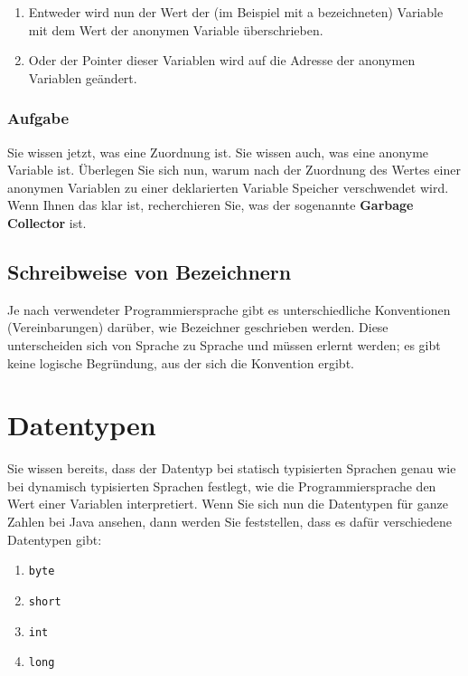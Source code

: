 \begin{enumerate}
	\item Entweder wird nun der Wert der (im Beispiel mit a bezeichneten) Variable mit dem Wert der anonymen Variable überschrieben.
	\item Oder der Pointer dieser Variablen wird auf die Adresse der anonymen Variablen geändert.
\end{enumerate}

\subsubsection{Aufgabe}

Sie wissen jetzt, was eine Zuordnung ist. Sie wissen auch, was eine anonyme Variable ist. Überlegen Sie sich nun, warum nach der Zuordnung des Wertes einer anonymen Variablen zu einer deklarierten Variable Speicher verschwendet wird. Wenn Ihnen das klar ist, recherchieren Sie, was der sogenannte \textbf{Garbage Collector} ist.

\subsection{Schreibweise von Bezeichnern}

Je nach verwendeter Programmiersprache gibt es unterschiedliche Konventionen (Vereinbarungen) darüber, wie Bezeichner geschrieben werden. Diese unterscheiden sich von Sprache zu Sprache und müssen erlernt werden; es gibt keine logische Begründung, aus der sich die Konvention ergibt.

\section{Datentypen}

Sie wissen bereits, dass der Datentyp bei statisch typisierten Sprachen genau wie bei dynamisch typisierten Sprachen festlegt, wie die Programmiersprache den Wert einer Variablen interpretiert. Wenn Sie sich nun die Datentypen für ganze Zahlen bei Java ansehen, dann werden Sie feststellen, dass es dafür verschiedene Datentypen gibt:

\begin{enumerate}
	\item \verb|byte|
	\item \verb|short|
	\item \verb|int|
	\item \verb|long|
\end{enumerate}

